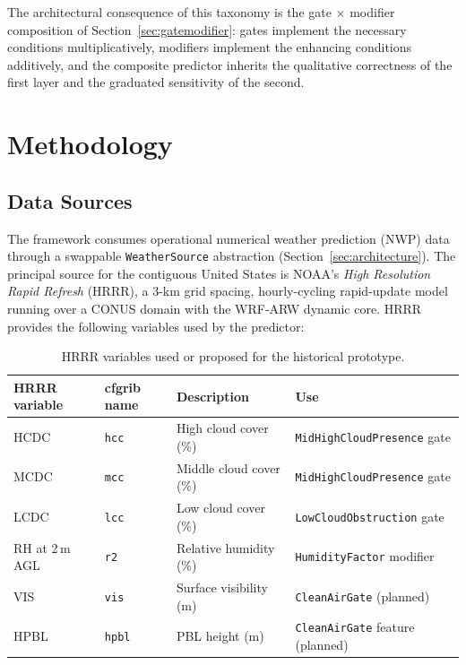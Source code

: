 \documentclass[11pt,a4paper]{article}
\begin{document}
The architectural consequence of this taxonomy is the gate $\times$ modifier composition of Section~\ref{sec:gatemodifier}: gates implement the necessary conditions multiplicatively, modifiers implement the enhancing conditions additively, and the composite predictor inherits the qualitative correctness of the first layer and the graduated sensitivity of the second.

\section{Methodology}
\label{sec:methodology}

\subsection{Data Sources}
\label{sec:datasources}

The framework consumes operational numerical weather prediction (NWP) data through a swappable \texttt{WeatherSource} abstraction (Section~\ref{sec:architecture}). The principal source for the contiguous United States is NOAA's \emph{High Resolution Rapid Refresh} (HRRR), a 3-km grid spacing, hourly-cycling rapid-update model running over a CONUS domain with the WRF-ARW dynamic core. HRRR provides the following variables used by the predictor:

\begin{table}[H]
\centering
\small
\begin{tabular}{llll}
\toprule
HRRR variable & cfgrib name & Description & Use \\
\midrule
HCDC & \texttt{hcc} & High cloud cover (\%) & \texttt{MidHighCloudPresence} gate \\
MCDC & \texttt{mcc} & Middle cloud cover (\%) & \texttt{MidHighCloudPresence} gate \\
LCDC & \texttt{lcc} & Low cloud cover (\%) & \texttt{LowCloudObstruction} gate \\
RH at 2\,m AGL & \texttt{r2} & Relative humidity (\%) & \texttt{HumidityFactor} modifier \\
VIS & \texttt{vis} & Surface visibility (m) & \texttt{CleanAirGate} (planned) \\
HPBL & \texttt{hpbl} & PBL height (m) & \texttt{CleanAirGate} feature (planned) \\
\bottomrule
\end{tabular}
\caption{HRRR variables used or proposed for the historical prototype.}
\label{tab:hrrr_vars}
\end{table}
\end{document}
